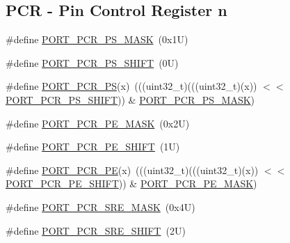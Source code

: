 \subsection*{P\+CR -\/ Pin Control Register n}
\begin{DoxyCompactItemize}
\item 
\#define \mbox{\hyperlink{group___p_o_r_t___register___masks_ga075e53298ec26cb1b463c95b902c39c1}{P\+O\+R\+T\+\_\+\+P\+C\+R\+\_\+\+P\+S\+\_\+\+M\+A\+SK}}~(0x1\+U)
\item 
\#define \mbox{\hyperlink{group___p_o_r_t___register___masks_ga7c040fa4d37750af5fef3ea1d0e370a9}{P\+O\+R\+T\+\_\+\+P\+C\+R\+\_\+\+P\+S\+\_\+\+S\+H\+I\+FT}}~(0\+U)
\item 
\#define \mbox{\hyperlink{group___p_o_r_t___register___masks_gabc7a02f49894ead35ce5d435bd05fb47}{P\+O\+R\+T\+\_\+\+P\+C\+R\+\_\+\+PS}}(x)~(((uint32\+\_\+t)(((uint32\+\_\+t)(x)) $<$$<$ \mbox{\hyperlink{group___p_o_r_t___register___masks_ga7c040fa4d37750af5fef3ea1d0e370a9}{P\+O\+R\+T\+\_\+\+P\+C\+R\+\_\+\+P\+S\+\_\+\+S\+H\+I\+FT}})) \& \mbox{\hyperlink{group___p_o_r_t___register___masks_ga075e53298ec26cb1b463c95b902c39c1}{P\+O\+R\+T\+\_\+\+P\+C\+R\+\_\+\+P\+S\+\_\+\+M\+A\+SK}})
\item 
\#define \mbox{\hyperlink{group___p_o_r_t___register___masks_ga125482aa2497e8435dac49c039b7fa97}{P\+O\+R\+T\+\_\+\+P\+C\+R\+\_\+\+P\+E\+\_\+\+M\+A\+SK}}~(0x2\+U)
\item 
\#define \mbox{\hyperlink{group___p_o_r_t___register___masks_ga18556773988cdd78e363959884dbec46}{P\+O\+R\+T\+\_\+\+P\+C\+R\+\_\+\+P\+E\+\_\+\+S\+H\+I\+FT}}~(1\+U)
\item 
\#define \mbox{\hyperlink{group___p_o_r_t___register___masks_gaa149bd9cd83aa17c213a827f9482a913}{P\+O\+R\+T\+\_\+\+P\+C\+R\+\_\+\+PE}}(x)~(((uint32\+\_\+t)(((uint32\+\_\+t)(x)) $<$$<$ \mbox{\hyperlink{group___p_o_r_t___register___masks_ga18556773988cdd78e363959884dbec46}{P\+O\+R\+T\+\_\+\+P\+C\+R\+\_\+\+P\+E\+\_\+\+S\+H\+I\+FT}})) \& \mbox{\hyperlink{group___p_o_r_t___register___masks_ga125482aa2497e8435dac49c039b7fa97}{P\+O\+R\+T\+\_\+\+P\+C\+R\+\_\+\+P\+E\+\_\+\+M\+A\+SK}})
\item 
\#define \mbox{\hyperlink{group___p_o_r_t___register___masks_ga9cdf02a7b160ee528de8e18aad2cae60}{P\+O\+R\+T\+\_\+\+P\+C\+R\+\_\+\+S\+R\+E\+\_\+\+M\+A\+SK}}~(0x4\+U)
\item 
\#define \mbox{\hyperlink{group___p_o_r_t___register___masks_ga87657ecdc18eb5b344d4e399a3a2fb70}{P\+O\+R\+T\+\_\+\+P\+C\+R\+\_\+\+S\+R\+E\+\_\+\+S\+H\+I\+FT}}~(2\+U)
\item 

\end{DoxyCompactItemize}
